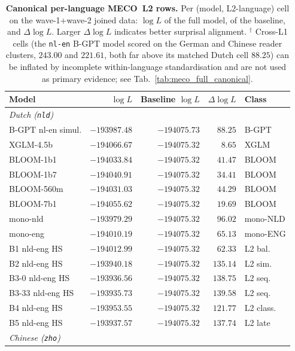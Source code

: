 \begin{table}[!ht]
  \centering \small
  \caption{\textbf{Canonical per-language MECO~L2 rows.} Per (model, L2-language) cell on the wave-1$+$wave-2 joined data: $\log L$ of the full model, of the baseline, and $\Delta\log L$. Larger $\Delta\log L$ indicates better surprisal alignment. $^{\dagger}$ Cross-L1 cells (the \texttt{nl-en} B-GPT model scored on the German and Chinese reader clusters, $243.00$ and $221.61$, both far above its matched Dutch cell $88.25$) can be inflated by incomplete within-language standardisation and are not used as primary evidence; see Tab.~\ref{tab:meco_full_canonical}.}
  \label{tab:meco_langrows}
  \begin{tabular}{lrrrl}
    \toprule
    Model & $\log L$ & Baseline $\log L$ & $\Delta\log L$ & Class \\
    \midrule
    \multicolumn{5}{l}{\textit{Dutch (\texttt{nld})}} \\
    \midrule
    B-GPT nl-en simul. & $-193987.48$ & $-194075.73$ & $88.25$ & B-GPT \\
    XGLM-4.5b & $-194066.67$ & $-194075.32$ & $8.65$ & XGLM \\
    BLOOM-1b1 & $-194033.84$ & $-194075.32$ & $41.47$ & BLOOM \\
    BLOOM-1b7 & $-194040.91$ & $-194075.32$ & $34.41$ & BLOOM \\
    BLOOM-560m & $-194031.03$ & $-194075.32$ & $44.29$ & BLOOM \\
    BLOOM-7b1 & $-194055.62$ & $-194075.32$ & $19.69$ & BLOOM \\
    mono-nld & $-193979.29$ & $-194075.32$ & $96.02$ & mono-NLD \\
    mono-eng & $-194010.19$ & $-194075.32$ & $65.13$ & mono-ENG \\
    B1 nld-eng HS & $-194012.99$ & $-194075.32$ & $62.33$ & L2 bal. \\
    B2 nld-eng HS & $-193940.18$ & $-194075.32$ & $135.14$ & L2 sim. \\
    B3-0 nld-eng HS & $-193936.56$ & $-194075.32$ & $138.75$ & L2 seq. \\
    B3-33 nld-eng HS & $-193935.73$ & $-194075.32$ & $139.58$ & L2 seq. \\
    B4 nld-eng HS & $-193953.55$ & $-194075.32$ & $121.77$ & L2 class. \\
    B5 nld-eng HS & $-193937.57$ & $-194075.32$ & $137.74$ & L2 late \\
    \midrule
    \multicolumn{5}{l}{\textit{Chinese (\texttt{zho})}} \\

\end{tabular}
\end{table}
